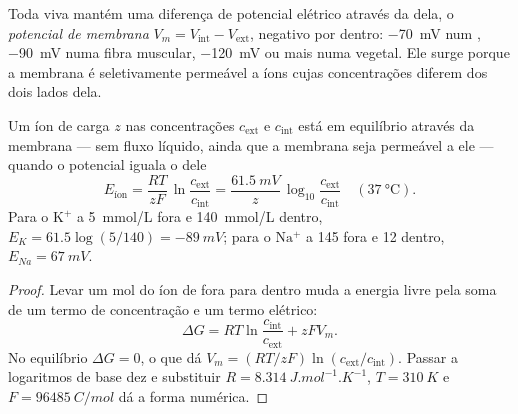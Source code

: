 \begin{definition}\label{def:b1:membranes-transport:potential}
Toda  viva mantém uma diferença de potencial elétrico através da
 dela, o
\emph{potencial de membrana}
$V_m = V_{\text{int}} - V_{\text{ext}}$, negativo por dentro:
\qty{-70}{mV} num , \qty{-90}{mV} numa fibra muscular,
\qty{-120}{mV} ou mais numa  vegetal. Ele surge porque a membrana
é seletivamente permeável a íons cujas concentrações diferem dos dois
lados dela.
\end{definition}

\begin{theorem}\label{thm:b1:membranes-transport:nernst}
Um íon de carga $z$ nas concentrações $c_{\text{ext}}$ e
$c_{\text{int}}$ está em equilíbrio através da membrana --- sem fluxo
líquido, ainda que a membrana seja permeável a ele --- quando o
potencial iguala o \emph{} dele
\[
E_{\text{íon}} = \frac{RT}{zF}\,\ln\frac{c_{\text{ext}}}{c_{\text{int}}}
= \frac{\qty{61.5}{mV}}{z}\,\log_{10}\frac{c_{\text{ext}}}{c_{\text{int}}}
\quad (\qty{37}{\celsius}).
\]
Para o $\mathrm{K^+}$ a \qty{5}{mmol/L} fora e \qty{140}{mmol/L}
dentro, $E_K = 61.5\log(5/140) = \qty{-89}{mV}$; para o $\mathrm{Na^+}$ a
\qty{145}{} fora e \qty{12}{} dentro, $E_{Na} = \qty{+67}{mV}$.
\end{theorem}
\begin{proof}
Levar um mol do íon de fora para dentro muda a energia livre pela soma
de um termo de concentração e um termo elétrico:
\[
\Delta G = RT\ln\frac{c_{\text{int}}}{c_{\text{ext}}} + zFV_m .
\]
No equilíbrio $\Delta G = 0$, o que dá $V_m = (RT/zF)\ln(c_{\text{ext}}/c_{\text{int}})$.
Passar a logaritmos de base dez e substituir $R = \qty{8.314}{J.mol^{-1}.K^{-1}}$,
$T = \qty{310}{K}$ e $F = \qty{96485}{C/mol}$ dá a forma numérica.
\end{proof}

